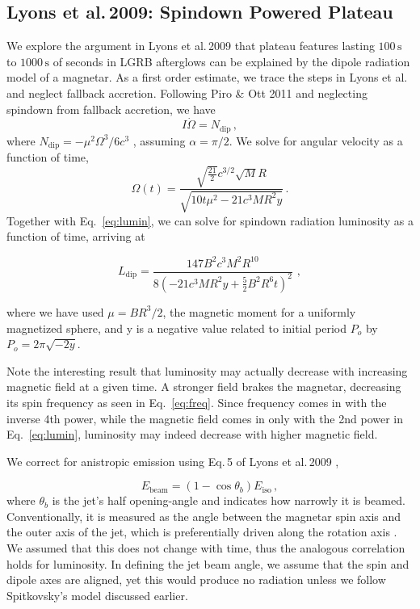 \documentclass{article}
\begin{document}
\subsection{Lyons et al.\,2009: Spindown Powered Plateau} \label{sec:41}
We explore the argument in Lyons et al.\,2009 \cite{Lyons:2009ka} that plateau features lasting $100\,\mathrm{s}$ to $1000\,\mathrm{s}$ of seconds in LGRB afterglows can be explained by the dipole radiation model of a magnetar.
As a first order estimate, we trace the steps in Lyons et al. and neglect fallback accretion. Following Piro \& Ott 2011 \cite{Piro:2011ed} and neglecting spindown from fallback accretion, we have
\begin{equation} I \dot{\Omega}=N_{\mathrm{dip}}\,, \end{equation}
where $N_{\mathrm{dip}}= -\mu ^2 \Omega^3/6c^3$\,\,,
assuming $\alpha = \pi/2$.
We solve for angular velocity as a function of time,
\begin{equation}\label{eq:freq}
\Omega(t) = \frac{\sqrt{\frac{21}{2}} c^{3/2} \sqrt{M} R}{\sqrt{10 t\mu^2 - 21 c^3 M R^2 y}}\,.
\end{equation}
Together with Eq.~\ref{eq:lumin}, we can solve for spindown radiation luminosity as a function of time, arriving at

\begin{equation}
L_\mathrm{dip}=\frac{147 B^2 c^3 M^2 R^{10}}{8(-21 c^3 M R^2 y+ \frac{5}{2} B^2 R^6 t)^2}\,\,,
\end{equation}

where we have used $\mu= B R^3/2$, the magnetic moment for a uniformly magnetized sphere, and y is a negative value related to initial period $P_o$ by $P_o= 2\pi \sqrt{-2 y}$.

\hspace{4cm}

Note the interesting result that luminosity may actually decrease with increasing magnetic field at a given time. A stronger field brakes the magnetar, decreasing its spin frequency as seen in Eq.~\ref{eq:freq}. Since frequency comes in with the inverse 4th power, while the magnetic field comes in only with the 2nd power in Eq.~\ref{eq:lumin}, luminosity may indeed decrease with higher magnetic field.

We correct for anistropic emission using Eq.\,5 of Lyons et al.\,2009 \cite{Lyons:2009ka},

\begin{equation}
 E_{\mathrm{beam}}= (1-\cos{\theta_b}) E_{\mathrm{iso}}\,,
 \end{equation}
 where $\theta_b$ is the jet's half opening-angle and indicates how narrowly it is beamed. Conventionally, it is measured as the angle between the magnetar spin axis and the outer axis of the jet, which is preferentially driven along the rotation axis \cite{Bucciantini:2007hy}. We assumed that this does not change with time, thus the analogous correlation holds for luminosity. In defining the jet beam angle, we assume that the spin and dipole axes are aligned, yet this would produce no radiation unless we follow Spitkovsky's model discussed earlier. 
\end{document}
